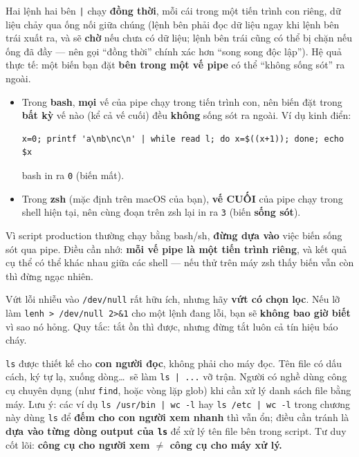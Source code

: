 \documentclass[12pt,a4paper]{article}
\newcommand{\cmd}[1]{\texttt{#1}}
\begin{document}
\begin{seniorbox}[title={Góc Senior \#4 --- Mỗi vế của pipe chạy trong một tiến trình con (subprocess) riêng}]
Hai lệnh hai bên \cmd{|} chạy \textbf{đồng thời}, mỗi cái trong một tiến trình con riêng, dữ liệu chảy qua ống nối giữa chúng (lệnh bên phải đọc dữ liệu ngay khi lệnh bên trái xuất ra, và sẽ \textbf{chờ} nếu chưa có dữ liệu; lệnh bên trái cũng có thể bị chặn nếu ống đã đầy --- nên gọi ``đồng thời'' chính xác hơn ``song song độc lập''). Hệ quả thực tế: một biến bạn đặt \textbf{bên trong một vế pipe} có thể ``không sống sót'' ra ngoài.

\begin{notebox}[title={Quan trọng --- kết quả tùy shell, đừng học thuộc một quy tắc tuyệt đối}]
\begin{itemize}[leftmargin=1.4em]
\item Trong \textbf{bash}, \textbf{mọi} vế của pipe chạy trong tiến trình con, nên biến đặt trong \textbf{bất kỳ} vế nào (kể cả vế cuối) đều \textbf{không} sống sót ra ngoài. Ví dụ kinh điển:
\begin{Verbatim}
x=0; printf 'a\nb\nc\n' | while read l; do x=$((x+1)); done; echo $x
\end{Verbatim}
bash in ra \cmd{0} (biến mất).
\item Trong \textbf{zsh} (mặc định trên macOS của bạn), \textbf{vế CUỐI} của pipe chạy trong shell hiện tại, nên cùng đoạn trên zsh lại in ra \cmd{3} (biến \textbf{sống sót}).
\end{itemize}

Vì script production thường chạy bằng bash/sh, \textbf{đừng dựa vào} việc biến sống sót qua pipe. Điều cần nhớ: \textbf{mỗi vế pipe là một tiến trình riêng}, và kết quả cụ thể có thể khác nhau giữa các shell --- nếu thử trên máy zsh thấy biến vẫn còn thì đừng ngạc nhiên.
\end{notebox}
\end{seniorbox}

\begin{seniorbox}[title={Góc Senior \#5 --- \texttt{/dev/null} để ``tắt ồn'' có chủ đích}]
Vứt lỗi nhiễu vào \cmd{/dev/null} rất hữu ích, nhưng hãy \textbf{vứt có chọn lọc}. Nếu lỡ làm \cmd{lenh > /dev/null 2>\&1} cho một lệnh đang lỗi, bạn sẽ \textbf{không bao giờ biết} vì sao nó hỏng. Quy tắc: tắt ồn thì được, nhưng đừng tắt luôn cả tín hiệu báo cháy.
\end{seniorbox}

\begin{seniorbox}[title={Góc Senior \#6 --- ``Đừng phân tích đầu ra của \texttt{ls} trong script''}]
\cmd{ls} được thiết kế cho \textbf{con người đọc}, không phải cho máy đọc. Tên file có dấu cách, ký tự lạ, xuống dòng\ldots\ sẽ làm \cmd{ls | ...} vỡ trận. Người có nghề dùng công cụ chuyên dụng (như \cmd{find}, hoặc vòng lặp glob) khi cần xử lý danh sách file bằng máy. Lưu ý: các ví dụ \cmd{ls /usr/bin | wc -l} hay \cmd{ls /etc | wc -l} trong chương này dùng \cmd{ls} để \textbf{đếm cho con người xem nhanh} thì vẫn ổn; điều cần tránh là \textbf{dựa vào từng dòng output của \cmd{ls}} để xử lý tên file bên trong script. Tư duy cốt lõi: \textbf{công cụ cho người xem $\neq$ công cụ cho máy xử lý.}
\end{seniorbox}
\end{document}
